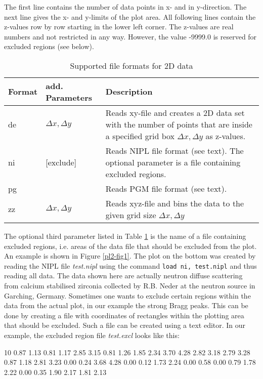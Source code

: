 The first line contains the number of data points in x- and in y-direction.
The next line gives the x- and y-limits of the plot area.  All following
lines contain the z-values row by row starting in the lower left corner.
The z-values are real numbers and not restricted in any way.  However, the
value -9999.0 is reserved for excluded regions (see below).

\begin{table}[htb]
\centering
\begin{tabularx}{\textwidth}{|p{15mm}|p{30mm}|X|}
  \hline
  {\bf Format} & {\bf add. Parameters} & {\bf Description} \\
  \hline\hline
  de  &  $\Delta x,\Delta y$ & Reads xy-file and creates a 2D data
                    set with the number of points that are inside a
                    specified grid box $\Delta x,\Delta y$ as z-values.\\
  ni  &  [exclude] & Reads NIPL file format (see text). The optional
                     parameter is a file containing excluded regions. \\
  pg  &            & Reads PGM file format (see text). \\
  zz  &  $\Delta x,\Delta y$ & Reads xyz-file and bins the data to the
                     given grid size $\Delta x,\Delta y$ \\
  \hline
\end{tabularx}
\caption{\label{pl2-tab1}Supported file formats for 2D data}
\end{table}

The optional third parameter listed in Table \ref{pl2-tab1} is the
name of a file containing excluded regions, i.e.  areas of the data
file that should be excluded from the plot.  An example is shown in
Figure \ref{pl2-fig1}.  The plot on the bottom was created by
reading the NIPL file {\it test.nipl} using the command {\tt load
ni, test.nipl} and thus reading all data.  The data shown here are
actually neutron diffuse scattering from calcium stabilised zirconia
collected by R.B.  Neder at the neutron source in Garching, Germany.
Sometimes one wants to exclude certain regions within the data from
the actual plot, in our example the strong Bragg peaks.  This can be
done by creating a file with coordinates of rectangles within the
plotting area that should be excluded.  Such a file can be created
using a text editor.  In our example, the excluded region file {\it
test.excl} looks like this:

\begin{MacVerbatim}
 10
 0.87  1.13  0.81  1.17
 2.85  3.15  0.81  1.26
 1.85  2.34  3.70  4.28
 2.82  3.18  2.79  3.28
 0.87  1.18  2.81  3.23
 0.00  0.24  3.68  4.28
 0.00  0.12  1.73  2.24
 0.00  0.58  0.00  0.79
 1.78  2.22  0.00  0.35
 1.90  2.17  1.81  2.13
\end{MacVerbatim}

